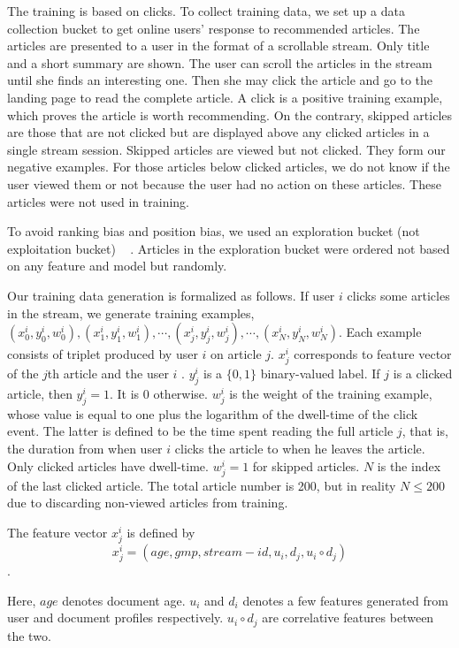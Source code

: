 The training is based on clicks. To collect training data, we set up a data 
collection bucket to get online users' response to recommended articles.  The 
articles are presented to a user in the format of a scrollable stream. Only 
title and a short summary are shown. The user can scroll the articles in the 
stream until she finds an interesting one. Then she may click the article and 
go to the landing page to read the complete article. A click is a positive 
training example, which proves the article is worth recommending. On the 
contrary, skipped articles are those that are not clicked but are displayed 
above any clicked articles in a single stream session. Skipped articles are 
viewed but not clicked.  They form our negative examples. For those articles 
below clicked articles, we do not know if the user viewed them or not because 
the user had no action on these articles. These articles were not used in 
training.  

To avoid ranking bias and position bias, we used an exploration bucket (not 
exploitation bucket) ~\cite{Li:2010:CAP:1772690.1772758} . Articles in the 
exploration bucket were ordered not based on any feature and model but 
randomly.

Our training data generation is formalized as follows. If user $i$ clicks some 
articles in the stream, we generate training examples, 
${(x_{0}^{i},y_{0}^{i},w_{0}^{i}),(x_{1}^{i},y_{1}^{i},w_{1}^{i}),\cdots,(x_{j}^{i},y_{j}^{i},w_{j}^{i}),\cdots,(x_{N}^{i},y_{N}^{i},w_{N}^{i})}$.
 Each example consists of triplet produced by user $i$ on article $j$. 
$x_{j}^{i}$ corresponds to feature vector of the $j$th article and the user 
$i$ . $y_{j}^{i}$ is a $\{0,1\}$ binary-valued label. If $j$ is a clicked 
article, 
then $y_{j}^{i}=1$. It is 0 otherwise.  $w_{j}^{i}$ is the weight of the 
training example, whose value is equal to one plus the logarithm of the 
dwell-time of the click event. The latter is defined to be the time spent 
reading the full article $j$, that is, the duration from when user $i$ clicks 
the article to when he leaves the article.  Only clicked articles have 
dwell-time. $w_{j}^{i}=1$ for skipped articles.  $N$ is the index of the last 
clicked article. The total article number is 200, but in reality $N \le 200$ 
due to discarding non-viewed articles from training. 

The feature vector $x_j^i$ is defined by
$$x_{j}^{i}=(age, gmp, stream-id, u_{i}, d_{j}, u_{i} \circ d_{j})$$.

Here, $age$ denotes document age. $u_{i}$ and $d_i$ denotes a few features 
generated from user and document profiles respectively.  $u_{i} \circ d_{j}$ 
are correlative features between the two.


